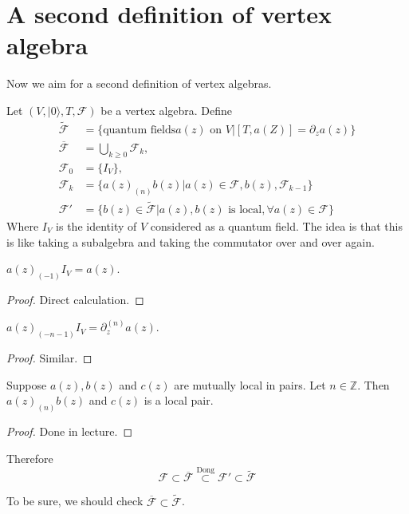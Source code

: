 \section{A second definition of vertex
algebra}
\label{section-secon-defin-verte-algeb}

\noindent
Now we aim for a second definition of vertex
algebras.

Let $(V,|0\rangle,T,\mathcal{F})$ be a vertex
algebra.
Define
$$
\begin{aligned}
\tilde{\mathcal{F}}&=\{\text{quantum fields
$a(z)$ on $V$}
|[T,a(Z)]=\partial_za(z)\}\\
\overline{\mathcal{F}}&=\bigcup_{k\geq
0}\mathcal{F}_k,\\
\mathcal{F}_0&=\{I_V\},\\
\mathcal{F}_k&=\{a(z)_{(n)}b(z)|a(z)\in
\mathcal{F},b(z),\mathcal{F}_{k-1}\}\\
\mathcal{F}'&=\{b(z) \in
\tilde{\mathcal{F}}|a(z),b(z)\text{ is
local},
\forall  a(z) \in \mathcal{F}\}
\end{aligned}
$$
Where $I_V$ is the identity of $V$ considered
as a quantum field.
The idea is that this is like taking a
subalgebra and taking
the commutator over and over again.

\begin{lemma}
\label{lemma-simple-lemma1}
$a(z)_{(-1)}I_V=a(z)$.
\end{lemma}

\begin{proof}
Direct calculation.
\end{proof}

\begin{lemma}
\label{lemma-simple-lemma2}
$a(z)_{(-n-1)}I_V=\partial_z^{(n)}a(z)$.
\end{lemma}

\begin{proof}
Similar.
\end{proof}

\begin{lemma}[Dong]
\label{lemma-dong}
Suppose $a(z),b(z)$ and $c(z)$ are mutually
local in pairs.
Let $n \in \mathbb{Z}$. Then $a(z)_{(n)}b(z)$
and $c(z)$
is a local pair.
\end{lemma}

\begin{proof}
Done in lecture.
\end{proof}

Therefore
$$
\mathcal{F} \subset
\overline{\mathcal{F}}\overset{\text{Dong}}
{\subset}
\mathcal{F}'\subset \tilde{\mathcal{F}}
$$
\begin{remark}
\label{remark-Fbar-subset-Ftilde}
To be sure, we should check
$\overline{\mathcal{F}}\subset
\tilde{\mathcal{F}}$.
\end{remark}

